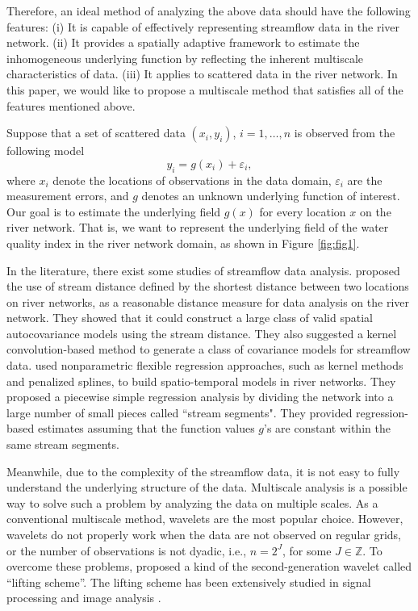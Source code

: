 \documentclass[11pt,titlepage]{article}
\begin{document}
Therefore, an ideal method of analyzing the above data should have the following features: (i) It is capable of effectively representing streamflow data in the river network. (ii) It provides a spatially adaptive framework to estimate the inhomogeneous underlying function by reflecting the inherent multiscale characteristics of data. (iii) It applies to scattered data in the river network. In this paper, we would like to propose a multiscale method that satisfies all of the features mentioned above. 

Suppose that a set of scattered data $(x_i, y_i)$, $i=1,\ldots,n$ is observed from the following model 
\begin{equation}\label{eq:scattered}
y_i = g(x_i)+\varepsilon_i, 
\end{equation}
where $x_i$ denote the locations of observations in the data domain, $\varepsilon_i$ are the measurement errors, and $g$  denotes an unknown underlying function of interest. Our goal is to estimate the underlying field $g(x)$ for every location $x$ on the river network. That is, we want to represent the underlying field of the water quality index in the river network domain, as shown in Figure \ref{fig:fig1}. 

In the literature, there exist some studies of streamflow data analysis. \cite{VerHoef(2006)} proposed the use of stream distance  defined by the shortest distance between two locations on river networks, as a reasonable distance measure for data analysis on the river network. They showed that it could construct a large class of valid spatial autocovariance models using the stream distance. They also suggested a kernel convolution-based method to generate a class of covariance models for streamflow data. \cite{ODonnell2014} used nonparametric flexible regression approaches, such as kernel methods and penalized splines, to build spatio-temporal models in river networks. They proposed a piecewise simple regression analysis by dividing the network into a large number of small pieces called ``stream segments".  They provided regression-based estimates assuming that the function values $g$'s are constant within the same stream segments.

Meanwhile, due to the complexity of the streamflow data, it is not easy to fully understand the underlying structure of the  data. Multiscale analysis is a possible way to solve such a problem by analyzing the data on multiple scales. As a conventional multiscale method, wavelets are the most popular choice. However, wavelets do not properly work when the data are not observed on regular grids, or the number of observations is not dyadic, i.e., $n=2^{J}$, for some $J\in \mathbb{Z}$. To overcome these problems, \citet{Sweldens1996,Sweldens1998} proposed a kind of the second-generation wavelet called ``lifting scheme''. The lifting scheme has been extensively studied in signal processing and image analysis \citep{Jansen2005}. 
\end{document}
